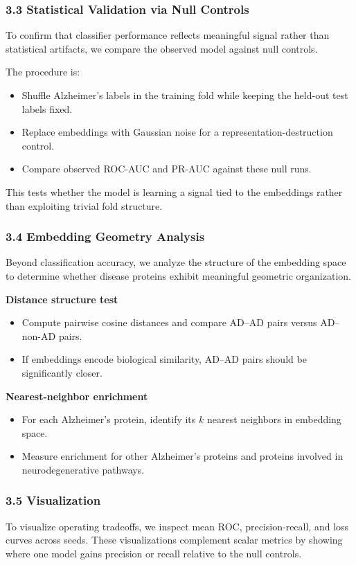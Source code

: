\documentclass{article}
\begin{document}
\subsubsection*{3.3 Statistical Validation via Null Controls}
To confirm that classifier performance reflects meaningful signal rather than statistical artifacts, we compare the observed model against null controls.

The procedure is:
\begin{itemize}
    \item Shuffle Alzheimer's labels in the training fold while keeping the held-out test labels fixed.
    \item Replace embeddings with Gaussian noise for a representation-destruction control.
    \item Compare observed ROC-AUC and PR-AUC against these null runs.
\end{itemize}

This tests whether the model is learning a signal tied to the embeddings rather than exploiting trivial fold structure.

\subsubsection*{3.4 Embedding Geometry Analysis}
Beyond classification accuracy, we analyze the structure of the embedding space to determine whether disease proteins exhibit meaningful geometric organization.

\textbf{Distance structure test}
\begin{itemize}
    \item Compute pairwise cosine distances and compare AD--AD pairs versus AD--non-AD pairs.
    \item If embeddings encode biological similarity, AD--AD pairs should be significantly closer.
\end{itemize}

\textbf{Nearest-neighbor enrichment}
\begin{itemize}
    \item For each Alzheimer's protein, identify its $k$ nearest neighbors in embedding space.
    \item Measure enrichment for other Alzheimer's proteins and proteins involved in neurodegenerative pathways.
\end{itemize}

\subsubsection*{3.5 Visualization}
To visualize operating tradeoffs, we inspect mean ROC, precision-recall, and loss curves across seeds. These visualizations complement scalar metrics by showing where one model gains precision or recall relative to the null controls.
\end{document}
